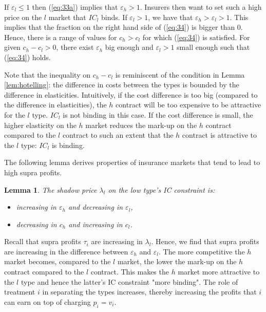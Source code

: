 \documentclass[12pt,english,a4paper]{article}
\newtheorem{lemma}{Lemma}
\begin{document}
If \(\varepsilon_l \leq 1\) then (\ref{eq:33a}) implies that \(\varepsilon_h > 1\). Insurers then want to set such a high price on the \(l\) market that \(IC_l\) binds. If \(\varepsilon_l > 1\), we have that \(\varepsilon_h > \varepsilon_l>1\). This implies that the fraction on the right hand side of (\ref{eq:34}) is bigger than 0. Hence, there is a range of values for \(c_h>c_l\) for which (\ref{eq:34}) is satisfied. For given \(c_h-c_l>0\), there exist \(\varepsilon_h\) big enough and \(\varepsilon_l>1\) small enough such that (\ref{eq:34}) holds.

Note that the inequality on \(c_h-c_l\) is reminiscent of the condition in Lemma \ref{lem:hotelling}: the difference in costs between the types is bounded by the difference in elasticities. Intuitively, if the cost difference is too big (compared to the difference in elasticities), the \(h\) contract will be too expensive to be attractive for the \(l\) type. \(IC_l\) is not binding in this case. If the cost difference is small, the higher elasticity on the \(h\) market reduces the mark-up on the \(h\) contract compared to the \(l\) contract to such an extent that the \(h\) contract is attractive to the \(l\) type: \(IC_l\) is binding.

The following lemma derives properties of insurance markets that tend to lead to high supra profits.

\begin{lemma} \label{lem:LambdaLproperties}
The shadow price $\lambda_l$ on the low type's IC constraint is:
\begin{itemize}
\item increasing in $\varepsilon_h$ and decreasing in $\varepsilon_l$,
\item decreasing in $c_h$ and increasing in $c_l$.
\end{itemize}
\end{lemma}

Recall that supra profits \(\tau_i\) are increasing in \(\lambda_l\). Hence, we find that supra profits are increasing in the difference between \(\varepsilon_h\) and \(\varepsilon_l\). The more competitive the \(h\) market becomes, compared to the \(l\) market, the lower the mark-up on the \(h\) contract compared to the \(l\) contract. This makes the \(h\) market more attractive to the \(l\) type and hence the latter's IC constraint "more binding". The role of treatment \(i\) in separating the types increases, thereby increasing the profits that \(i\) can earn on top of charging \(p_i=v_i\).
\end{document}
